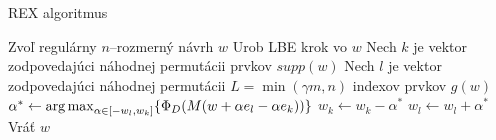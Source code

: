 \begin{algorithm}[H]
	\caption{REX algoritmus \cite{rex_harman}}
	\label{rex}
	\begin{algorithmic}[1]
		\State Zvoľ regulárny $n$--rozmerný návrh $w$
			\State Urob LBE krok vo $w$
			\State Nech $k$ je vektor zodpovedajúci náhodnej permutácii prvkov $supp(w)$
			\State Nech $l$ je vektor zodpovedajúci náhodnej permutácii $L=\min(\gamma m, n)$ indexov prvkov $g(w)$
					\State $\alpha^* \leftarrow \operatorname*{arg\,max}_{\alpha \in [-w_l, w_k]} \{ \Phi_D (M(w+\alpha e_l -\alpha e_k))\}$
						\State $w_k \leftarrow w_k - \alpha^*$
						\State $w_l \leftarrow w_l + \alpha^*$
					\EndIf
				\EndFor
			\EndFor
		\EndWhile
		\State Vráť $w$
	\end{algorithmic}
\end{algorithm}


